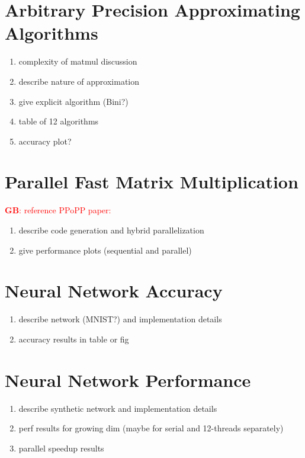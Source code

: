 \documentclass[conference]{IEEEtran}
\newcommand{\GB}[1]{\textcolor{red}{\textbf{GB}: #1}}
\begin{document}
\section{Arbitrary Precision Approximating Algorithms}

\begin{enumerate}
	\item complexity of matmul discussion
	\item describe nature of approximation
	\item give explicit algorithm (Bini?)
	\item table of 12 algorithms
	\item accuracy plot?
\end{enumerate}

\section{Parallel Fast Matrix Multiplication}

\GB{reference PPoPP paper: \cite{BB15}}

\begin{enumerate}
	\item describe code generation and hybrid parallelization
	\item give performance plots (sequential and parallel)
\end{enumerate}

\section{Neural Network Accuracy}

\begin{enumerate}
	\item describe network (MNIST?) and implementation details
	\item accuracy results in table or fig
\end{enumerate}

\section{Neural Network Performance}

\begin{enumerate}
	\item describe synthetic network and implementation details
	\item perf results for growing dim (maybe for serial and 12-threads separately)
	\item parallel speedup results
\end{enumerate}
\end{document}
